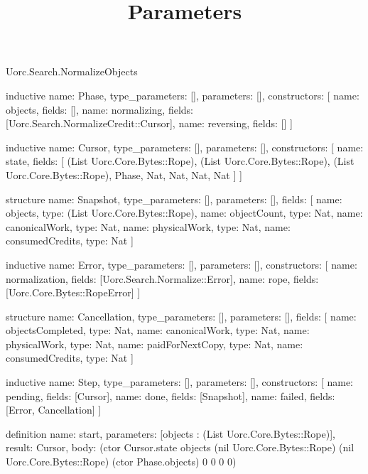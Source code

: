 \begin{lexlean}{Uorc.Search.NormalizeObjects}
\title{Parameters}
\begin{semanticmodule}
inductive{
  name: Phase,
  type_parameters: [],
  parameters: [],
  constructors: [
    {name: objects, fields: []},
    {name: normalizing, fields: [Uorc.Search.NormalizeCredit::Cursor]},
    {name: reversing, fields: []}
  ]
}

inductive{
  name: Cursor,
  type_parameters: [],
  parameters: [],
  constructors: [
    {
      name: state,
      fields: [
        (List Uorc.Core.Bytes::Rope),
        (List Uorc.Core.Bytes::Rope),
        (List Uorc.Core.Bytes::Rope),
        Phase,
        Nat,
        Nat,
        Nat,
        Nat
      ]
    }
  ]
}

structure{
  name: Snapshot,
  type_parameters: [],
  parameters: [],
  fields: [
    {name: objects, type: (List Uorc.Core.Bytes::Rope)},
    {name: objectCount, type: Nat},
    {name: canonicalWork, type: Nat},
    {name: physicalWork, type: Nat},
    {name: consumedCredits, type: Nat}
  ]
}

inductive{
  name: Error,
  type_parameters: [],
  parameters: [],
  constructors: [
    {name: normalization, fields: [Uorc.Search.Normalize::Error]},
    {name: rope, fields: [Uorc.Core.Bytes::RopeError]}
  ]
}

structure{
  name: Cancellation,
  type_parameters: [],
  parameters: [],
  fields: [
    {name: objectsCompleted, type: Nat},
    {name: canonicalWork, type: Nat},
    {name: physicalWork, type: Nat},
    {name: paidForNextCopy, type: Nat},
    {name: consumedCredits, type: Nat}
  ]
}

inductive{
  name: Step,
  type_parameters: [],
  parameters: [],
  constructors: [
    {name: pending, fields: [Cursor]},
    {name: done, fields: [Snapshot]},
    {name: failed, fields: [Error, Cancellation]}
  ]
}

definition{
  name: start,
  parameters: [objects : (List Uorc.Core.Bytes::Rope)],
  result: Cursor,
  body: (ctor Cursor.state objects (nil Uorc.Core.Bytes::Rope) (nil Uorc.Core.Bytes::Rope) (ctor Phase.objects) 0 0 0 0)
}


\end{semanticmodule}
\end{lexlean}
